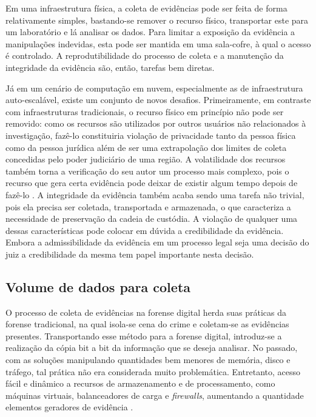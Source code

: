 Em uma infraestrutura física, a coleta de evidências pode ser feita de forma relativamente simples, bastando-se remover o recurso físico, transportar este para um laboratório e lá analisar os dados. 
%
Para limitar a exposição da evidência a manipulações indevidas, esta pode ser mantida em uma sala-cofre, à qual o acesso é controlado.
%
A reprodutibilidade do processo de coleta e a manutenção da integridade da evidência são, então, tarefas bem diretas.


Já em um cenário de computação em nuvem, especialmente as de infraestrutura auto-escalável, existe um conjunto de novos desafios. 
%
Primeiramente, em contraste com infraestruturas tradicionais, o recurso físico em princípio não pode ser removido: como os recursos são utilizados por outros usuários não relacionados à investigação, fazê-lo constituiria violação de privacidade tanto da pessoa física como da pessoa jurídica além de ser uma extrapolação dos limites de coleta concedidas pelo poder judiciário de uma região.
%
A volatilidade dos recursos também torna a verificação do seu autor um processo mais complexo, pois o recurso que gera certa evidência pode deixar de existir algum tempo depois de fazê-lo \cite{SimouCloudChlng:2014}.
%
A integridade da evidência também acaba sendo uma tarefa não trivial, pois ela precisa ser coletada, transportada e armazenada, o que caracteriza a necessidade de preservação da cadeia de custódia.
%
A violação de qualquer uma dessas características pode colocar em dúvida a credibilidade da evidência. Embora a admissibilidade da evidência em um processo legal seja uma decisão do juiz a credibilidade da mesma tem papel importante nesta decisão.


\subsection{Volume de dados para coleta}
\label{sec:volumedados}

O processo de coleta de evidências na forense digital herda suas práticas da forense tradicional, na qual isola-se cena do crime e coletam-se as evidências presentes. 
%
Transportando esse método para a forense digital, introduz-se a realização da cópia bit a bit da informação que se deseja analisar.
%
No passado, com as soluções manipulando quantidades bem menores de memória, disco e tráfego, tal prática não era considerada muito problemática. 
%
Entretanto, acesso fácil e dinâmico a recursos de armazenamento e de processamento, como máquinas virtuais, balanceadores de carga e \textit{firewalls}, aumentando a quantidade elementos geradores de evidência \cite{WenFAAS:2013}.
%

